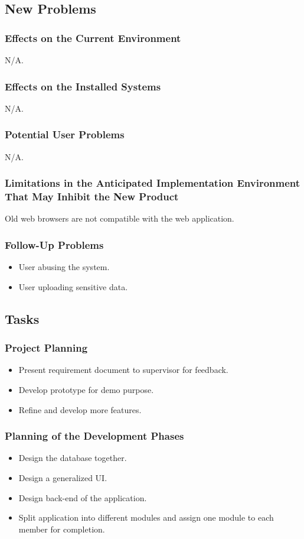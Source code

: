 \documentclass[12pt]{article}
\begin{document}
{\subsection{New Problems}
\subsubsection{Effects on the Current Environment}
N/A.
\subsubsection{Effects on the Installed Systems}
N/A.
\subsubsection{Potential User Problems}
N/A.
\subsubsection{Limitations in the Anticipated Implementation Environment That 
May Inhibit the New Product}
Old web browsers are not compatible with the web application.
\subsubsection{Follow-Up Problems}
\begin{itemize}
  \item User abusing the system.
  \item User uploading sensitive data.
\end{itemize}

\subsection{Tasks}
\subsubsection{Project Planning}
\begin{itemize}
  \item Present requirement document to supervisor for feedback.
  \item Develop prototype for demo purpose.
  \item Refine and develop more features.
\end{itemize}
\subsubsection{Planning of the Development Phases}
\begin{itemize}
    \item Design the database together.
    \item Design a generalized UI.
    \item Design back-end of the application.
    \item Split application into different modules and assign one module to each 
member for completion.
\end{itemize}

}
\end{document}
